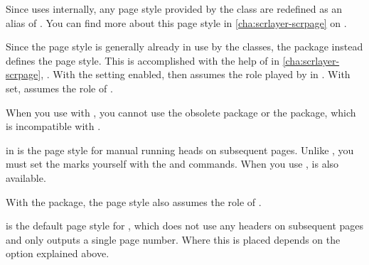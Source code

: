 \begin{description}
  Since  uses
  \hyperref[cha:scrlayer-scrpage]{} internally, any
  page style  provided by the class are
  redefined as an alias of .
  You can find more about this page style in \autoref{cha:scrlayer-scrpage} on
  .
\item[{\PageStyle{letter}}]
  Since the  page style is generally already in use by
  the classes, the  package instead
  defines the  page style. This is accomplished with the
  help of \hyperref[cha:scrlayer-scrpage]{} in
  \autoref{cha:scrlayer-scrpage}, . With the
   setting enabled,  then assumes the
  role played by  in . With
   set,  assumes the role of
  .
  
  When you use
  \hyperref[cha:scrlayer-scrpage]{} with
  , you cannot use the obsolete
   package or the
   package, which is incompatible
  with \KOMAScript{}.
\item[{\PageStyle{myheadings}}]
  in  is the page style for manual
  running heads on subsequent pages. Unlike , you must set
  the marks yourself with the
   and
   commands. When you
  use \hyperref[cha:scrlayer-scrpage]{},
   is also
  available.

  With the  package, the
   page style also assumes the role of
  .
\item[{\PageStyle{plain}}]
  is the default page style for ,
  which does not use any headers on subsequent pages and only outputs
  a single page number. Where this is placed depends on the
   option explained above.


\end{description}
